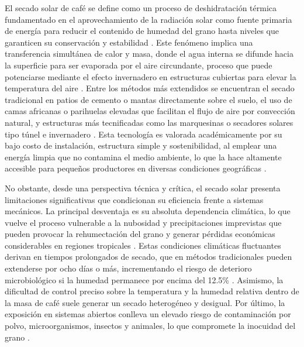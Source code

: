 El secado solar de café se define como un proceso de deshidratación térmica fundamentado en el aprovechamiento de la radiación solar como fuente primaria de energía para reducir el contenido de humedad del grano hasta niveles que garanticen su conservación y estabilidad \parencite{firdissa_coffee_2022, guevara-sanchez_effect_2019, kebede_performance_2025}. Este fenómeno implica una transferencia simultánea de calor y masa, donde el agua interna se difunde hacia la superficie para ser evaporada por el aire circundante, proceso que puede potenciarse mediante el efecto invernadero en estructuras cubiertas para elevar la temperatura del aire \parencite{firdissa_coffee_2022, siagian_field_2017}. Entre los métodos más extendidos se encuentran el secado tradicional en patios de cemento o mantas directamente sobre el suelo, el uso de camas africanas o parihuelas elevadas que facilitan el flujo de aire por convección natural, y estructuras más tecnificadas como las marquesinas o secadores solares tipo túnel e invernadero \parencite{firdissa_coffee_2022, huaman-murillo_physical_2024}. Esta tecnología es valorada académicamente por su bajo costo de instalación, estructura simple y sostenibilidad, al emplear una energía limpia que no contamina el medio ambiente, lo que la hace altamente accesible para pequeños productores en diversas condiciones geográficas \parencite{guevara-sanchez_effect_2019, kebede_performance_2025}.

No obstante, desde una perspectiva técnica y crítica, el secado solar presenta limitaciones significativas que condicionan su eficiencia frente a sistemas mecánicos. La principal desventaja es su absoluta dependencia climática, lo que vuelve el proceso vulnerable a la nubosidad y precipitaciones imprevistas que pueden provocar la rehumectación del grano y generar pérdidas económicas considerables en regiones tropicales \parencite{guevara-sanchez_effect_2019, huaman-murillo_physical_2024, kebede_performance_2025}. Estas condiciones climáticas fluctuantes derivan en tiempos prolongados de secado, que en métodos tradicionales pueden extenderse por ocho días o más, incrementando el riesgo de deterioro microbiológico si la humedad permanece por encima del 12.5\% \parencite{guevara-sanchez_effect_2019, firdissa_coffee_2022, huaman-murillo_physical_2024}. Asimismo, la dificultad de control preciso sobre la temperatura y la humedad relativa dentro de la masa de café suele generar un secado heterogéneo y desigual. Por último, la exposición en sistemas abiertos conlleva un elevado riesgo de contaminación por polvo, microorganismos, insectos y animales, lo que compromete la inocuidad del grano \parencite{huaman-murillo_physical_2024, kebede_performance_2025}.

